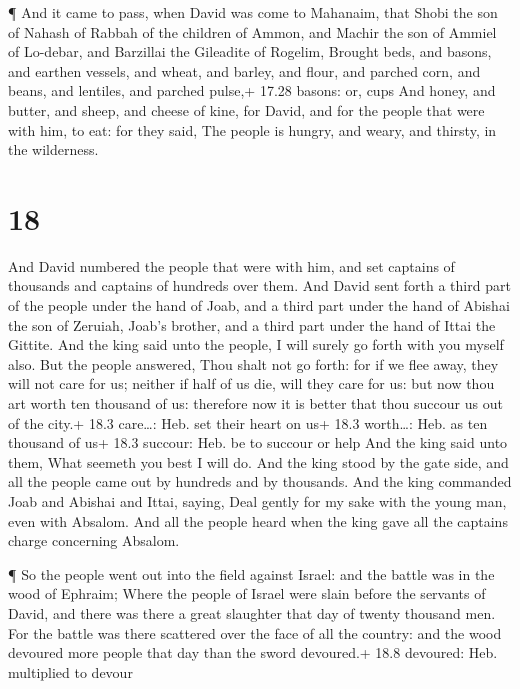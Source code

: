  ¶ And it came to pass, when David was come to Mahanaim,
that Shobi the son of Nahash of Rabbah of the children of Ammon, and
Machir the son of Ammiel of Lo-debar, and Barzillai the Gileadite of
Rogelim,  Brought beds, and basons, and earthen vessels,
and wheat, and barley, and flour, and parched corn, and beans, and
lentiles, and parched pulse,+ 17.28 basons: or, cups  And
honey, and butter, and sheep, and cheese of kine, for David, and for the
people that were with him, to eat: for they said, The people is hungry,
and weary, and thirsty, in the wilderness.

\hypertarget{section-17}{%
\section{18}\label{section-17}}

 And David numbered the people that were with him, and set
captains of thousands and captains of hundreds over them. 
And David sent forth a third part of the people under the hand of Joab,
and a third part under the hand of Abishai the son of Zeruiah, Joab's
brother, and a third part under the hand of Ittai the Gittite. And the
king said unto the people, I will surely go forth with you myself also.
 But the people answered, Thou shalt not go forth: for if we
flee away, they will not care for us; neither if half of us die, will
they care for us: but now thou art worth ten thousand of us: therefore
now it is better that thou succour us out of the city.+ 18.3 care\ldots:
Heb. set their heart on us+ 18.3 worth\ldots: Heb. as ten thousand of
us+ 18.3 succour: Heb. be to succour or help  And the king
said unto them, What seemeth you best I will do. And the king stood by
the gate side, and all the people came out by hundreds and by thousands.
 And the king commanded Joab and Abishai and Ittai, saying,
Deal gently for my sake with the young man, even with Absalom. And all
the people heard when the king gave all the captains charge concerning
Absalom.

 ¶ So the people went out into the field against Israel: and
the battle was in the wood of Ephraim;  Where the people of
Israel were slain before the servants of David, and there was there a
great slaughter that day of twenty thousand men.  For the
battle was there scattered over the face of all the country: and the
wood devoured more people that day than the sword devoured.+ 18.8
devoured: Heb. multiplied to devour

